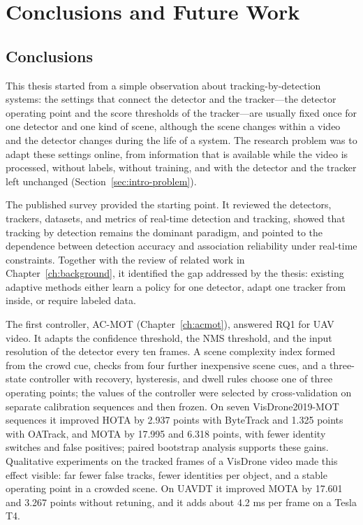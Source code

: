 \chapter{Conclusions and Future Work}\label{ch:conclusions}

\section{Conclusions}\label{sec:conc-conclusion}
This thesis started from a simple observation about tracking-by-detection systems: the settings that connect the detector and the tracker---the detector operating point and the score thresholds of the tracker---are usually fixed once for one detector and one kind of scene, although the scene changes within a video and the detector changes during the life of a system. The research problem was to adapt these settings online, from information that is available while the video is processed, without labels, without training, and with the detector and the tracker left unchanged (Section~\ref{sec:intro-problem}).

The published survey \cite{ismail2026realtime} provided the starting point. It reviewed the detectors, trackers, datasets, and metrics of real-time detection and tracking, showed that tracking by detection remains the dominant paradigm, and pointed to the dependence between detection accuracy and association reliability under real-time constraints. Together with the review of related work in Chapter~\ref{ch:background}, it identified the gap addressed by the thesis: existing adaptive methods either learn a policy for one detector, adapt one tracker from inside, or require labeled data.

The first controller, AC-MOT (Chapter~\ref{ch:acmot}), answered RQ1 for UAV video. It adapts the confidence threshold, the NMS threshold, and the input resolution of the detector every ten frames. A scene complexity index formed from the crowd cue, checks from four further inexpensive scene cues, and a three-state controller with recovery, hysteresis, and dwell rules choose one of three operating points; the values of the controller were selected by cross-validation on separate calibration sequences and then frozen. On seven VisDrone2019-MOT sequences it improved HOTA by 2.937 points with ByteTrack and 1.325 points with OATrack, and MOTA by 17.995 and 6.318 points, with fewer identity switches and false positives; paired bootstrap analysis supports these gains. Qualitative experiments on the tracked frames of a VisDrone video made this effect visible: far fewer false tracks, fewer identities per object, and a stable operating point in a crowded scene. On UAVDT it improved MOTA by 17.601 and 3.267 points without retuning, and it adds about 4.2 ms per frame on a Tesla T4.

